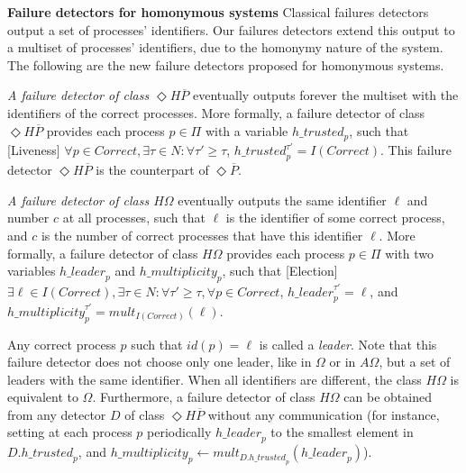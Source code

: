 \documentclass[10pt, conference, compsocconf]{IEEEtran}
\newcommand{\tightparagraph}[1]{\smallskip \noindent \textbf{#1} \hspace{1ex}}
\newcommand{\OO}{{\Omega}}
\newcommand{\HO}{{H\Omega}}
\newcommand{\AO}{{A\Omega}}
\newcommand{\HP}{{ \Diamond H\overline{P}}}
\newcommand{\C}{{\mathit{Correct}}}
\newcommand{\trusted}{{\mathit{h\_trusted}}}
\newcommand{\leader}{{\mathit{h\_leader}}}
\newcommand{\multiplicity}{{\mathit{h\_multiplicity}}}
\begin{document}
\tightparagraph{Failure detectors for homonymous systems}
Classical failures detectors output a set of processes' identifiers. 
Our failures detectors extend this output to 
a multiset of processes' identifiers, due to the homonymy nature of the system.
The following are the new failure detectors proposed for homonymous systems. 


\emph{A failure detector of class $\HP$} eventually 
outputs forever the multiset with the 
identifiers of the correct processes. More formally,
a failure detector of class $\HP$ provides each process  $p \in \Pi$ 
with a variable $\trusted_p$, such that [Liveness]
$\forall p \in \C, \exists \tau \in N  : \forall \tau' \ge \tau$, 
$\trusted_p^{\tau'} = I(\C)$. This failure detector $\HP$ is the 
counterpart of $\Diamond\overline{P}$.

\emph{A failure detector of class $\HO$} 
eventually outputs the same identifier $\ell$
and number $c$ at all processes, such that $\ell$ is the identifier of 
some correct process, and $c$ is the number of correct processes that 
have this identifier $\ell$. More formally,
a failure detector of class $\HO$ provides each process  $p \in \Pi$ 
with two variables $\leader_p$ and $\multiplicity_p$, such that 
[Election] $\exists \ell \in I(\C), \exists \tau \in N  : 
\forall \tau' \ge \tau, \forall p \in \C$, $\leader_p^{\tau'}=\ell$, 
and $\multiplicity_p^{\tau'}=\mathit{mult}_{I(\C)}(\ell)$.

Any correct process $p$ such that $id(p)=\ell$ is called a \emph{leader}.
Note that this failure detector does not choose only one leader, like 
in $\Omega$ or in $\AO$, but a set of leaders with the same identifier. 
When all identifiers are different, the class $\HO$ is equivalent to $\OO$. 
Furthermore, a failure detector of class $\HO$ can be obtained from any 
detector $D$ of class $\HP$ without any communication (for instance, 
setting at each process $p$ periodically $\leader_p$ to the smallest 
element in $D.\trusted_p$, and 
$\multiplicity_p \leftarrow \mathit{mult}_{D.\trusted_p}(\leader_p)$).
\end{document}
